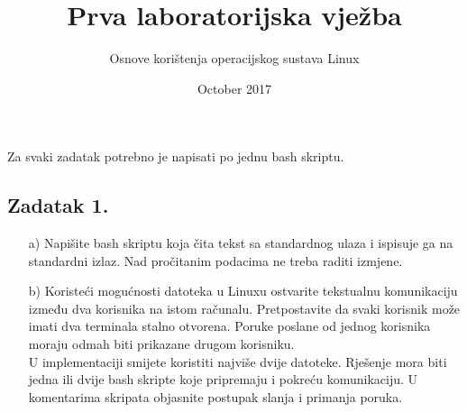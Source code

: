 \documentclass{exam}
\title{Prva laboratorijska vježba}
\author{Osnove korištenja operacijskog sustava Linux}
\date{October 2017}
\begin{document}
      \maketitle
      Za svaki zadatak potrebno je napisati po jednu bash skriptu.
      \subsection*{Zadatak 1.}
        \begin{itemize}
                \item[a)] Napišite bash skriptu koja čita tekst sa standardnog
                ulaza i ispisuje ga na standardni izlaz. Nad pročitanim podacima
                ne treba raditi izmjene.
                        \item[b)] Koristeći mogućnosti datoteka u Linuxu
                        ostvarite tekstualnu komunikaciju između dva korisnika
                        na istom računalu. Pretpostavite da svaki korisnik može
                        imati dva terminala stalno otvorena. Poruke poslane od
                        jednog korisnika moraju odmah biti prikazane drugom
                        korisniku.\\
                                U implementaciji smijete koristiti najviše dvije
                                datoteke. Rješenje mora biti jedna ili dvije
                                bash skripte koje pripremaju i pokreću
                                komunikaciju. U komentarima skripata objasnite
                                postupak slanja i primanja poruka.
                                \end{itemize}
\end{document}
